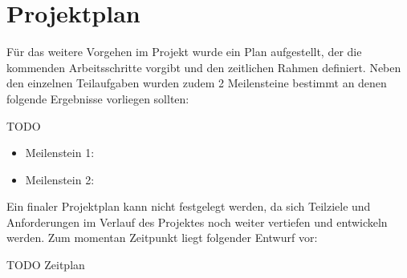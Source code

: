 
\section{Projektplan}
Für das weitere Vorgehen im Projekt wurde ein Plan aufgestellt, der die kommenden Arbeitsschritte vorgibt und den zeitlichen Rahmen definiert. Neben den einzelnen Teilaufgaben wurden zudem 2 Meilensteine bestimmt an denen folgende Ergebnisse vorliegen sollten: 

TODO
\begin{itemize}
   \item Meilenstein 1: 
   \item Meilenstein 2: 
   
\end{itemize}

Ein finaler Projektplan kann nicht festgelegt werden, da sich Teilziele und Anforderungen im Verlauf des Projektes noch weiter vertiefen und entwickeln werden. Zum momentan Zeitpunkt liegt folgender Entwurf vor:

TODO Zeitplan